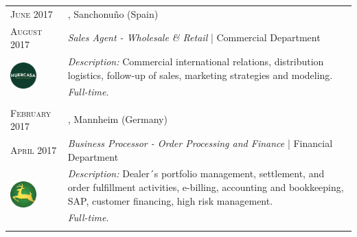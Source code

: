 %
%


\vspace{1.5 mm}

\begin{longtable}{R{2.5cm}|p{14.8cm}}

 	\textsc{June 2017} & \textsc{}, \faMapMarker \hspace{0.5 mm} Sanchonuño (Spain) \\
 	\textsc{August 2017} 	& \textit{Sales Agent - Wholesale \& Retail} | Commercial Department \\
	 & 
	\footnotesize{\faTasks \emph{ Description: }Commercial international relations, distribution logistics, follow-up of sales, marketing strategies and modeling.} \\ &
	\footnotesize{\faFileText \emph{ Full-time}.} \\
 	 \\
 
 	\textsc{February 2017} & \textsc{}, \faMapMarker \hspace{0.5 mm} Mannheim (Germany) \\
 	\textsc{April 2017} 	& \textit{Business Processor - Order Processing and Finance} | Financial Department \\
	 & 
 	\footnotesize{\faTasks \emph{ Description: }Dealer´s portfolio management, settlement, and order fulfillment activities, e-billing, accounting and bookkeeping, SAP, customer financing, high risk management.} \\ &
	\footnotesize{\faFileText \emph{ Full-time}}. \\
 	 \\
	

\end{longtable}
